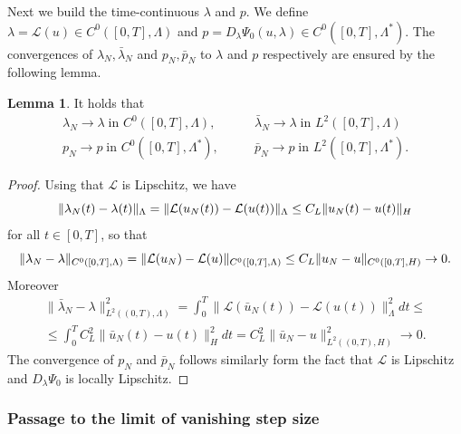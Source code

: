 \documentclass[a4paper,10pt,twoside]{amsbook}
\numberwithin{section}{chapter}
\numberwithin{equation}{chapter}
\theoremstyle{definition}
\newtheorem{lemma}[prop]{Lemma}
\DeclarePairedDelimiter{\norm}{\lVert}{\rVert}
\begin{document}
Next we build the time-continuous $\lambda$ and $p$. We define $\lambda=\mathcal{L}(u)\in C^0([0,T],\Lambda)$ and $p=D_\lambda\Psi_0(u,\lambda)\in C^0([0,T],\Lambda^*)$. The convergences of $\lambda_N,\bar\lambda_N$ and $p_N,\bar p_N$ to $\lambda$ and $p$ respectively are ensured by the following lemma.
\begin{lemma}
It holds that
\begin{align}
\lambda_N\to\lambda\;\text{in $C^0([0,T],\Lambda)$},\qquad & \bar\lambda_N\to\lambda\;\text{in $L^2([0,T],\Lambda)$} \\
p_N\to p\;\text{in $C^0([0,T],\Lambda^*)$},\qquad & \bar p_N\to p\;\text{in $L^2([0,T],\Lambda^*)$}.
\end{align}
\end{lemma}
\begin{proof}
Using that $\mathcal{L}$ is Lipschitz, we have
\[
\norm{\lambda_N(t)-\lambda(t)}_\Lambda=\norm{\mathcal{L}(u_N(t))-\mathcal{L}(u(t))}_\Lambda\le C_L\norm{u_N(t)-u(t)}_H
\]
for all $t\in[0,T]$, so that
\[
\norm{\lambda_N-\lambda}_{C^0([0,T],\Lambda)}=\norm{\mathcal{L}(u_N)-\mathcal{L}(u)}_{C^0([0,T],\Lambda)}\le C_L\norm{u_N-u}_{C^0([0,T],H)}\to0.
\]
Moreover
\[
\begin{split}
\|\bar{\lambda}_N-\lambda\|_{L^2((0,T),\Lambda)}^2=\int_0^T\|\mathcal{L}(\bar{u}_N(t))-\mathcal{L}(u(t))\|_\Lambda^2dt\le\\
\le\int_0^TC_L^2\|\bar{u}_N(t)-u(t)\|_H^2dt=C_L^2\|\bar{u}_N-u\|_{L^2((0,T),H)}^2\to0.
\end{split}
\]
The convergence of $p_N$ and $\bar p_N$ follows similarly form the fact that $\mathcal{L}$ is Lipschitz and $D_\lambda\Psi_0$ is locally Lipschitz.
\end{proof}

\subsubsection*{Passage to the limit of vanishing step size}
\end{document}
